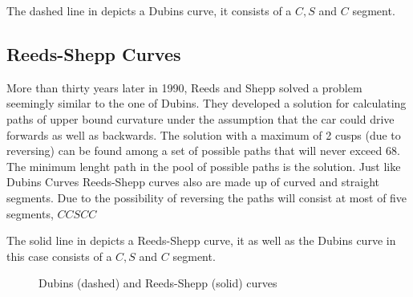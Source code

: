 The dashed line in  depicts a Dubins curve, it consists of a $C,S$ and $C$ segment.

\subsection{Reeds-Shepp Curves}
More than thirty years later in 1990, Reeds and Shepp solved a problem seemingly similar to the one of Dubins. They developed a solution for calculating paths of upper bound curvature under the assumption that the car could drive forwards as well as backwards. The solution with a maximum of 2 cusps (due to reversing) can be found among a set of possible paths that will never exceed 68. The minimum lenght path in the pool of possible paths is the solution. Just like Dubins Curves Reeds-Shepp curves also are made up of curved and straight segments. Due to the possibility of reversing the paths will consist at most of five segments, $CCSCC$ \cite{Reeds.1990}

The solid line in  depicts a Reeds-Shepp curve, it as well as the Dubins curve in this case consists of a $C,S$ and $C$ segment.

\begin{figure}[h]
    \caption[Paths of minimal length -- Dubins and Reeds-Shepp curves]{Dubins (dashed) and Reeds-Shepp (solid) curves}
    \label{fig:shortestPaths}
\end{figure}













































